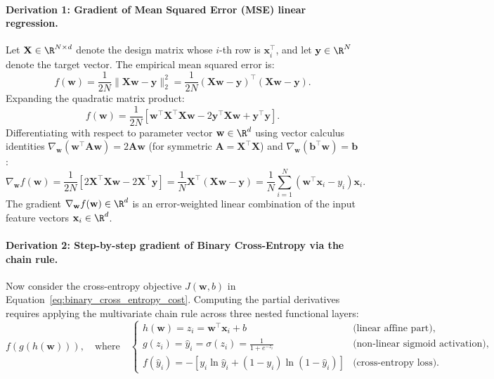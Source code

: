 \paragraph{Derivation 1: Gradient of Mean Squared Error (MSE) linear regression.}
Let $\mathbf{X} \in \R^{N \times d}$ denote the design matrix whose $i$-th row is $\mathbf{x}_i^\top$, and let $\mathbf{y} \in \R^N$ denote the target vector. The empirical mean squared error is:
\begin{equation}
f(\mathbf{w}) = \frac{1}{2N} \|\mathbf{X}\mathbf{w} - \mathbf{y}\|_2^2 = \frac{1}{2N} (\mathbf{X}\mathbf{w} - \mathbf{y})^\top (\mathbf{X}\mathbf{w} - \mathbf{y}).
\label{eq:mse_matrix_form}
\end{equation}
Expanding the quadratic matrix product:
\begin{equation}
f(\mathbf{w}) = \frac{1}{2N} \left[ \mathbf{w}^\top \mathbf{X}^\top \mathbf{X} \mathbf{w} - 2 \mathbf{y}^\top \mathbf{X} \mathbf{w} + \mathbf{y}^\top \mathbf{y} \right].
\end{equation}
Differentiating with respect to parameter vector $\mathbf{w} \in \R^d$ using vector calculus identities $\nabla_\mathbf{w} (\mathbf{w}^\top \mathbf{A} \mathbf{w}) = 2\mathbf{A}\mathbf{w}$ (for symmetric $\mathbf{A} = \mathbf{X}^\top \mathbf{X}$) and $\nabla_\mathbf{w} (\mathbf{b}^\top \mathbf{w}) = \mathbf{b}$:
\begin{equation}
\nabla_\mathbf{w} f(\mathbf{w}) = \frac{1}{2N} \left[ 2 \mathbf{X}^\top \mathbf{X} \mathbf{w} - 2 \mathbf{X}^\top \mathbf{y} \right] = \frac{1}{N} \mathbf{X}^\top (\mathbf{X}\mathbf{w} - \mathbf{y}) = \frac{1}{N} \sum_{i=1}^N (\mathbf{w}^\top \mathbf{x}_i - y_i) \mathbf{x}_i.
\label{eq:mse_gradient_exact}
\end{equation}
The gradient $\nabla_\mathbf{w} f(\mathbf{w}) \in \R^d$ is an error-weighted linear combination of the input feature vectors $\mathbf{x}_i \in \R^d$.

\paragraph{Derivation 2: Step-by-step gradient of Binary Cross-Entropy via the chain rule.}
Now consider the cross-entropy objective $J(\mathbf{w}, b)$ in Equation~\eqref{eq:binary_cross_entropy_cost}. Computing the partial derivatives requires applying the multivariate chain rule across three nested functional layers:
\begin{equation}
f(g(h(\mathbf{w}))), \quad \text{where} \quad \begin{cases}
h(\mathbf{w}) = z_i = \mathbf{w}^\top \mathbf{x}_i + b & \text{(linear affine part)}, \\
g(z_i) = \hat{y}_i = \sigma(z_i) = \frac{1}{1 + e^{-z_i}} & \text{(non-linear sigmoid activation)}, \\
f(\hat{y}_i) = -\left[ y_i \ln \hat{y}_i + (1 - y_i) \ln(1 - \hat{y}_i) \right] & \text{(cross-entropy loss)}.
\end{cases}
\end{equation}

